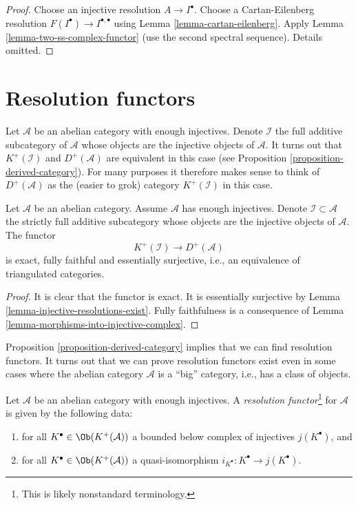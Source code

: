 \begin{proof}
Choose an injective resolution $A \to I^\bullet$.
Choose a Cartan-Eilenberg resolution
$F(I^\bullet) \to I^{\bullet, \bullet}$
using
Lemma \ref{lemma-cartan-eilenberg}.
Apply
Lemma \ref{lemma-two-ss-complex-functor}
(use the second spectral sequence).
Details omitted.
\end{proof}






\section{Resolution functors}
\label{section-derived-category}

\noindent
Let $\mathcal{A}$ be an abelian category with enough injectives.
Denote $\mathcal{I}$ the full additive subcategory of $\mathcal{A}$ whose
objects are the injective objects of $\mathcal{A}$.
It turns out that $K^{+}(\mathcal{I})$ and $D^{+}(\mathcal{A})$
are equivalent in this case (see
Proposition \ref{proposition-derived-category}).
For many purposes it therefore makes sense to think of
$D^{+}(\mathcal{A})$ as the (easier to grok) category $K^{+}(\mathcal{I})$
in this case.

\begin{proposition}
\label{proposition-derived-category}
Let $\mathcal{A}$ be an abelian category.
Assume $\mathcal{A}$ has enough injectives.
Denote $\mathcal{I} \subset \mathcal{A}$ the strictly full
additive subcategory whose objects are the injective objects of
$\mathcal{A}$.
The functor
$$
K^{+}(\mathcal{I}) \longrightarrow D^{+}(\mathcal{A})
$$
is exact, fully faithful and essentially surjective, i.e.,
an equivalence of triangulated categories.
\end{proposition}

\begin{proof}
It is clear that the functor is exact.
It is essentially surjective by
Lemma \ref{lemma-injective-resolutions-exist}.
Fully faithfulness is a consequence of
Lemma \ref{lemma-morphisms-into-injective-complex}.
\end{proof}

\noindent
Proposition \ref{proposition-derived-category}
implies that we can find resolution functors.
It turns out that we can prove resolution functors exist
even in some cases where the abelian category $\mathcal{A}$ is
a ``big'' category, i.e., has a class of objects.

\begin{definition}
\label{definition-localization-functor}
Let $\mathcal{A}$ be an abelian category with enough injectives.
A {\it resolution functor}\footnote{This is likely nonstandard terminology.}
for $\mathcal{A}$ is given by the following data:
\begin{enumerate}
\item for all $K^\bullet \in \Ob(K^{+}(\mathcal{A}))$ a
bounded below complex of injectives $j(K^\bullet)$, and
\item for all $K^\bullet \in \Ob(K^{+}(\mathcal{A}))$ a
quasi-isomorphism $i_{K^\bullet} : K^\bullet \to j(K^\bullet)$.
\end{enumerate}
\end{definition}

